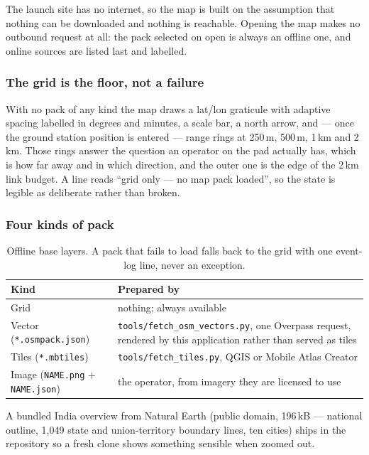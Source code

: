 \documentclass[11pt,a4paper]{article}
\begin{document}
The launch site has no internet, so the map is built on the assumption that
nothing can be downloaded and nothing is reachable. Opening the map makes no
outbound request at all: the pack selected on open is always an offline one,
and online sources are listed last and labelled.

\subsubsection{The grid is the floor, not a failure}

With no pack of any kind the map draws a lat/lon graticule with adaptive
spacing labelled in degrees and minutes, a scale bar, a north arrow, and ---
once the ground station position is entered --- range rings at 250\,m,
500\,m, 1\,km and 2\,km. Those rings answer the question an operator on the
pad actually has, which is how far away and in which direction, and the
outer one is the edge of the 2\,km link budget. A line reads ``grid only ---
no map pack loaded'', so the state is legible as deliberate rather than
broken.

\subsubsection{Four kinds of pack}

\begin{table}[htbp]
\centering
\begin{tabularx}{\textwidth}{@{}lX@{}}
\toprule
\textbf{Kind} & \textbf{Prepared by} \\
\midrule
Grid & nothing; always available \\
Vector (\texttt{*.osmpack.json}) & \texttt{tools/fetch\_osm\_vectors.py}, one
Overpass request, rendered by this application rather than served as tiles \\
Tiles (\texttt{*.mbtiles}) & \texttt{tools/fetch\_tiles.py}, QGIS or Mobile
Atlas Creator \\
Image (\texttt{NAME.png} + \texttt{NAME.json}) & the operator, from imagery
they are licensed to use \\
\bottomrule
\end{tabularx}
\caption{Offline base layers. A pack that fails to load falls back to the
grid with one event-log line, never an exception.}
\end{table}

A bundled India overview from Natural Earth (public domain, 196\,kB ---
national outline, 1{,}049 state and union-territory boundary lines, ten
cities) ships in the repository so a fresh clone shows something sensible
when zoomed out.
\end{document}
